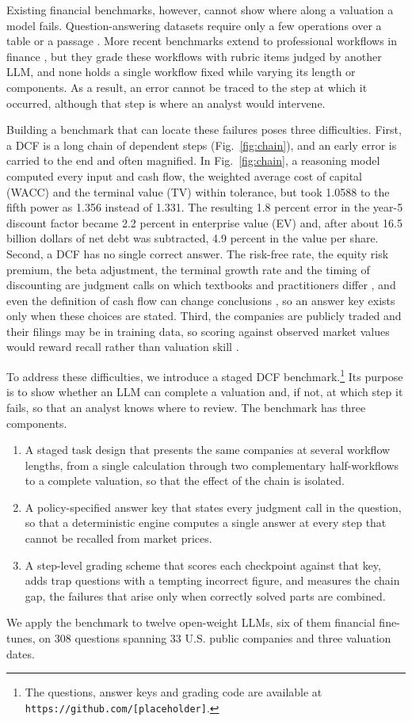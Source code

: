 \documentclass[conference]{IEEEtran}
\begin{document}
Existing financial benchmarks, however, cannot show where along a valuation a model fails. Question-answering datasets require only a few operations over a table or a passage \cite{b6,b7,b8,b9}. More recent benchmarks extend to professional workflows in finance \cite{b10,b11,b12}, but they grade these workflows with rubric items judged by another LLM, and none holds a single workflow fixed while varying its length or components. As a result, an error cannot be traced to the step at which it occurred, although that step is where an analyst would intervene.

Building a benchmark that can locate these failures poses three difficulties. First, a DCF is a long chain of dependent steps (Fig.~\ref{fig:chain}), and an early error is carried to the end and often magnified. In Fig.~\ref{fig:chain}, a reasoning model computed every input and cash flow, the weighted average cost of capital (WACC) and the terminal value (TV) within tolerance, but took 1.0588 to the fifth power as 1.356 instead of 1.331. The resulting 1.8 percent error in the year-5 discount factor became 2.2 percent in enterprise value (EV) and, after about 16.5 billion dollars of net debt was subtracted, 4.9 percent in the value per share. Second, a DCF has no single correct answer. The risk-free rate, the equity risk premium, the beta adjustment, the terminal growth rate and the timing of discounting are judgment calls on which textbooks and practitioners differ \cite{b3}, and even the definition of cash flow can change conclusions \cite{b13}, so an answer key exists only when these choices are stated. Third, the companies are publicly traded and their filings may be in training data, so scoring against observed market values would reward recall rather than valuation skill \cite{b5,b14}.

To address these difficulties, we introduce a staged DCF benchmark.\footnote{The questions, answer keys and grading code are available at \texttt{https://github.com/[placeholder]}.} Its purpose is to show whether an LLM can complete a valuation and, if not, at which step it fails, so that an analyst knows where to review. The benchmark has three components.
\begin{enumerate}
\item A staged task design that presents the same companies at several workflow lengths, from a single calculation through two complementary half-workflows to a complete valuation, so that the effect of the chain is isolated.
\item A policy-specified answer key that states every judgment call in the question, so that a deterministic engine computes a single answer at every step that cannot be recalled from market prices.
\item A step-level grading scheme that scores each checkpoint against that key, adds trap questions with a tempting incorrect figure, and measures the chain gap, the failures that arise only when correctly solved parts are combined.
\end{enumerate}
We apply the benchmark to twelve open-weight LLMs, six of them financial fine-tunes, on 308 questions spanning 33 U.S. public companies and three valuation dates.
\end{document}
